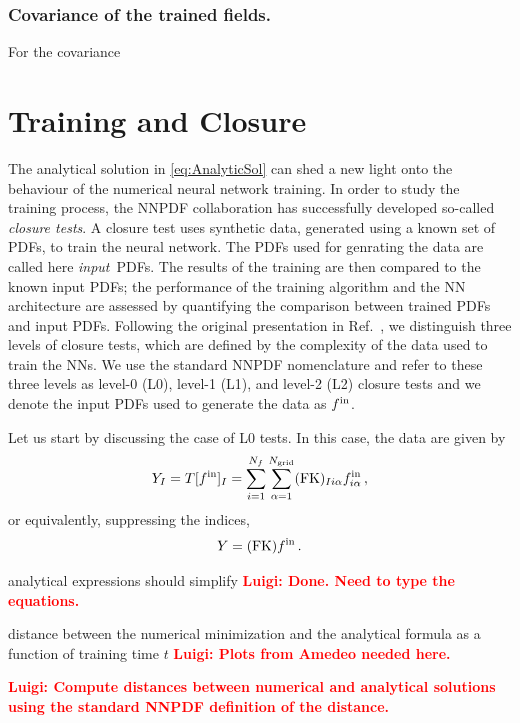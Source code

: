 \documentclass[11pt]{article}
\newcommand{\ldd}[1]{\textcolor{red}{\textbf{Luigi: #1}}}
\begin{document}
\subsubsection{Covariance of the trained fields.}
\label{sec:Covariance}
For the covariance


\newpage


\section{Training and Closure}

The analytical solution in \eqref{eq:AnalyticSol} can
shed a new light onto the behaviour of the numerical neural network training.
In order to study the training process, the NNPDF collaboration has successfully developed so-called
{\em closure tests}. A closure test uses synthetic data, generated using a known
set of PDFs, to train the neural network. The PDFs used for genrating the data are called here {\em input}\
PDFs. The results of the training are then compared to the
known input PDFs; the performance of the training algorithm and the NN
architecture are assessed by quantifying the comparison between trained PDFs and input PDFs.
Following the original presentation in Ref.~\cite{NNPDF:2014otw}, we distinguish three
levels of closure tests, which are defined by the complexity of the data used to train the NNs.
We use the standard NNPDF nomenclature and refer to these three levels as level-0 (L0), level-1 (L1),
and level-2 (L2) closure tests and we denote the input PDFs used to generate the data as $f^{\rm in}$.

Let us start by discussing the case of L0 tests. In this case, the data are given by
\begin{equation}
    \label{eq:DataL0}
    Y_I = T[f^{\rm in}]_I
        = \sum_{i=1}^{N_{f}} \sum_{\alpha=1}^{N_{\mathrm{grid}}} (\mathrm{FK})_{Ii\alpha} f^{\rm in}_{i\alpha}\, ,
\end{equation}
or equivalently, suppressing the indices,
\begin{equation}
    \label{eq:DataL0NoIndices}
    Y = (\mathrm{FK}) f^{\rm in}\, .
\end{equation}



analytical expressions should simplify \ldd{Done. Need to type the equations. }

distance between the numerical minimization and the analytical formula as a function of
training time $t$ \ldd{Plots from Amedeo needed here.}

\ldd{Compute distances between numerical and analytical solutions using the standard NNPDF definition of the
distance.}
\end{document}
